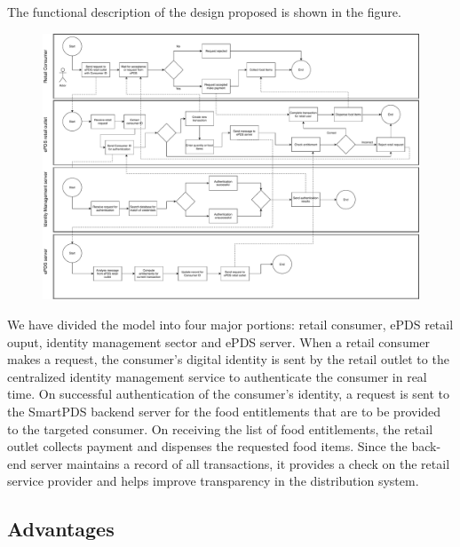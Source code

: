 \documentclass{article}
\begin{document}
The functional description of the design proposed is shown in the figure.

\begin{landscape}%
\begin{figure}[h]
\centering %
\includegraphics[width=20cm]{epds}
\end{figure}
\end{landscape}

We have divided the model into four major portions: retail consumer, ePDS retail ouput, identity management sector and ePDS server. When a retail consumer makes a request, the consumer's digital identity is sent by the retail outlet to the centralized identity management service to authenticate the consumer in real time. On successful authentication of the consumer's identity, a request is sent to the SmartPDS backend server for the food entitlements that are to be provided to the targeted consumer. On receiving the list of food entitlements, the retail outlet collects payment and dispenses the requested food items. Since the back-end server maintains a record of all transactions, it provides a check on the retail service provider and helps improve transparency in the distribution system.


\subsection{Advantages}
\end{document}
